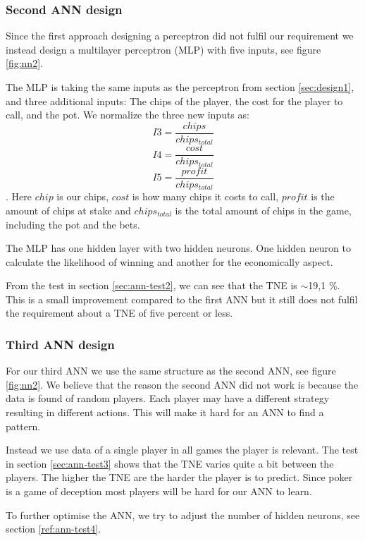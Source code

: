 \subsubsection{Second ANN design}
\label{sec:design2}
Since the first approach designing a perceptron did not fulfil our requirement we instead design a multilayer perceptron (MLP) with five inputs, see figure \ref{fig:nn2}.

The MLP is taking the same inputs as the perceptron from section \ref{sec:design1}, and three additional inputs: The chips of the player, the cost for the player to call, and the pot. We normalize the three new inputs as: \[I3 = \frac{chips}{chips_{total}}\] \[I4 = \frac{cost}{chips_{total}}\] \[I5 = \frac{profit}{chips_{total}}\]. 
Here $chip$ is our chips, $cost$ is how many chips it costs to call, $profit$ is the amount of chips at stake and $chips_{total}$ is the total amount of chips in the game, including the pot and the bets.

The MLP has one hidden layer with two hidden neurons. One hidden neuron to calculate the likelihood of winning and another for the economically aspect.



From the test in section \ref{sec:ann-test2}, we can see that the TNE is $\sim$19,1 \%. This is a small improvement compared to the first ANN but it still does not fulfil the requirement about a TNE of five percent or less. 

\subsubsection{Third ANN design}
\label{sec:design3}
For our third ANN we use the same structure as the second ANN, see figure \ref{fig:nn2}. We believe that the reason the second ANN did not work is because the data is found of random players. Each player may have a different strategy resulting in different actions. This will make it hard for an ANN to find a pattern. 

Instead we use data of a single player in all games the player is relevant. The test in section \ref{sec:ann-test3} shows that the TNE varies quite a bit between the players. The higher the TNE are the harder the player is to predict. Since poker is a game of deception most players will be hard for our ANN to learn.

To further optimise the ANN, we try to adjust the number of hidden neurons, see section \ref{ref:ann-test4}.

